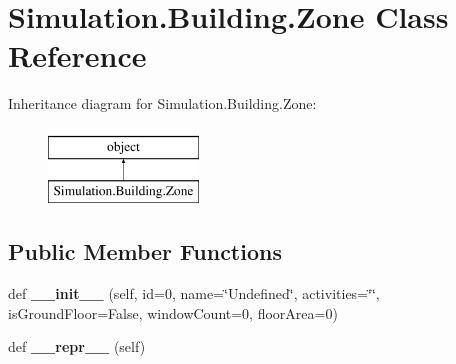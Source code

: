 \hypertarget{class_c_simulation_1_1_simulation_1_1_building_1_1_zone}{}\section{Simulation.\+Building.\+Zone Class Reference}
\label{class_c_simulation_1_1_simulation_1_1_building_1_1_zone}
Inheritance diagram for Simulation.\+Building.\+Zone\+:\begin{figure}[H]
\begin{center}
\leavevmode
\includegraphics[height=2.000000cm]{class_c_simulation_1_1_simulation_1_1_building_1_1_zone}
\end{center}
\end{figure}
\subsection*{Public Member Functions}
\begin{DoxyCompactItemize}
\item 
\mbox{\label{class_c_simulation_1_1_simulation_1_1_building_1_1_zone_a680f7cc742a2e6e01c12fbe511060590}} 
def {\bfseries \+\_\+\+\_\+init\+\_\+\+\_\+} (self, id=0, name=\char`\"{}Undefined\char`\"{}, activities=\char`\"{}\char`\"{}, is\+Ground\+Floor=False, window\+Count=0, floor\+Area=0)
\item 
\mbox{\label{class_c_simulation_1_1_simulation_1_1_building_1_1_zone_a9a47563093dfc5ba12274b66e368920c}} 
def {\bfseries \+\_\+\+\_\+repr\+\_\+\+\_\+} (self)
\end{DoxyCompactItemize}
